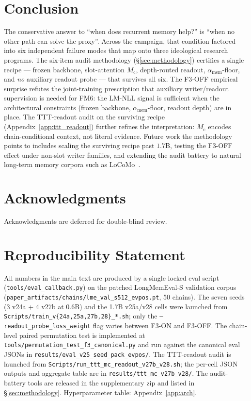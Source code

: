 \documentclass{article}
\newcommand{\Mc}{M_{\mathrm{c}}}
\newcommand{\amem}{\alpha_{\mathrm{mem}}}
\begin{document}
\section{Conclusion}
\label{sec:conclusion}

The conservative answer to ``when does recurrent memory help?'' is
``when no other path can solve the proxy''.  Across the campaign,
that condition factored into six independent failure modes that map
onto three ideological research programs.  The six-item audit
methodology (\S\ref{sec:methodology}) certifies a single recipe ---
frozen backbone, slot-attention $\Mc$, depth-routed readout,
$\amem$-floor, and \emph{no} auxiliary readout probe --- that
survives all six.  The F3-OFF empirical surprise refutes the
joint-training prescription that auxiliary writer/readout
supervision is needed for FM6: the LM-NLL signal is sufficient when
the architectural constraints (frozen backbone, $\amem$-floor,
readout depth) are in place.  The TTT-readout audit on the surviving
recipe (Appendix~\ref{app:ttt_readout}) further refines the
interpretation: $\Mc$ encodes chain-conditional context, not literal
evidence.  Future work the methodology points to includes scaling
the surviving recipe past $1.7$B, testing the F3-OFF effect under
non-slot writer families, and extending the audit battery to natural
long-term memory corpora such as LoCoMo~\cite{locomo2024}.

\section*{Acknowledgments}

Acknowledgments are deferred for double-blind review.

\section*{Reproducibility Statement}

All numbers in the main text are produced by a single locked eval
script (\texttt{tools/eval\_callback.py}) on the patched
LongMemEval-S validation corpus
(\texttt{paper\_artifacts/chains/lme\_val\_s512\_evpos.pt},
50 chains).  The seven seeds (3 v24a + 4 v27b at 0.6B) and the
1.7B v25a/v28 cells were launched from
\texttt{Scripts/train\_v\{24a,25a,27b,28\}\_*.sh}; only the
\texttt{--readout\_probe\_loss\_weight} flag varies between F3-ON
and F3-OFF.  The chain-level paired permutation test is implemented
at \texttt{tools/permutation\_test\_f3\_canonical.py} and run against
the canonical eval JSONs in
\texttt{results/eval\_v25\_seed\_pack\_evpos/}.  The TTT-readout
audit is launched from
\texttt{Scripts/run\_ttt\_mc\_readout\_v27b\_v28.sh}; the per-cell
JSON outputs and aggregate table are in
\texttt{results/ttt\_mc\_v27b\_v28/}.  The audit-battery tools are
released in the supplementary zip and listed in
\S\ref{sec:methodology}.  Hyperparameter table:
Appendix~\ref{app:arch}.
\end{document}
